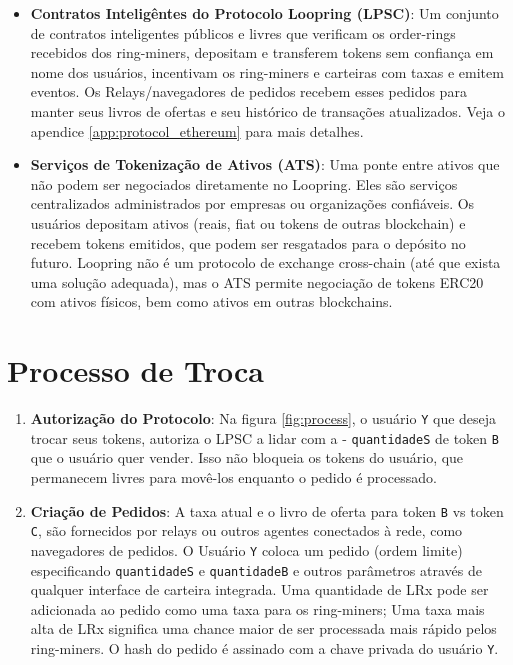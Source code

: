 \documentclass[UTF8,nofonts]{article}
\begin{document}
\begin{multicols}{2}
\begin{itemize}
\item \textbf{Contratos Inteligêntes do Protocolo Loopring (LPSC)}: Um conjunto de contratos inteligentes públicos e livres que verificam os order-rings recebidos dos ring-miners, depositam e transferem tokens sem confiança em nome dos usuários, incentivam os ring-miners e carteiras com taxas e emitem eventos. Os Relays/navegadores de pedidos recebem esses pedidos para manter seus livros de ofertas e seu histórico de transações atualizados. Veja o apendice \ref{app:protocol_ethereum} para mais detalhes.

\item \textbf{Serviços de Tokenização de Ativos (ATS)}: Uma ponte entre ativos que não podem ser negociados diretamente no Loopring. Eles são serviços centralizados administrados por empresas ou organizações confiáveis. Os usuários depositam ativos (reais, fiat ou tokens de outras blockchain) e recebem tokens emitidos, que podem ser resgatados para o depósito no futuro. Loopring não é um protocolo de exchange cross-chain  (até que exista uma solução adequada), mas o ATS permite negociação de tokens ERC20 \cite{ERC20} com ativos físicos, bem como ativos em outras blockchains.

\end{itemize}


\section{Processo de Troca\label{sec:process}}



\begin{enumerate} 


\item \textbf{Autorização do Protocolo}: Na figura \ref{fig:process}, o usuário \verb|Y| que deseja trocar seus tokens, autoriza o LPSC a lidar com a - \verb|quantidadeS| de token \verb|B| que o usuário quer vender. Isso não bloqueia os tokens do usuário, que permanecem livres para movê-los enquanto o pedido é processado.

\item \textbf{Criação de Pedidos}: A taxa atual e o livro de oferta para token \verb|B| vs token \verb|C|, são fornecidos por relays ou outros agentes conectados à rede, como navegadores de pedidos. O Usuário \verb|Y| coloca um pedido (ordem limite) especificando \verb|quantidadeS| e \verb|quantidadeB| e outros parâmetros através de qualquer interface de carteira integrada. Uma quantidade de LRx pode ser adicionada ao pedido como uma taxa para os ring-miners; Uma taxa mais alta de LRx significa uma chance maior de ser processada mais rápido pelos ring-miners. O hash do pedido é assinado com a chave privada do usuário \verb|Y|.


\end{enumerate}
\end{multicols}
\end{document}

